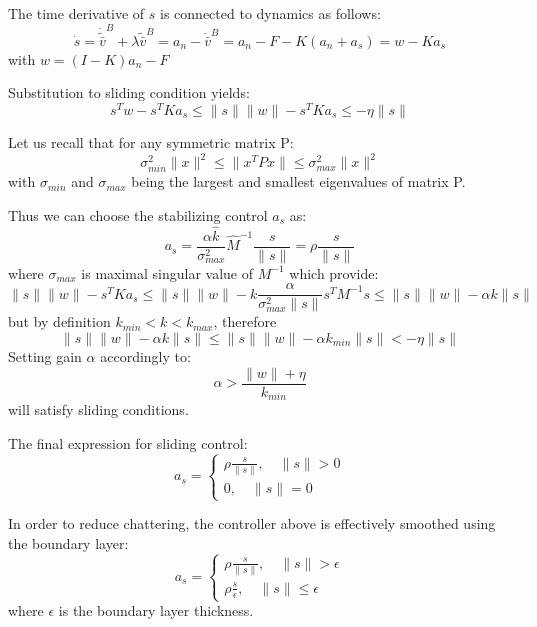     The time derivative of $s$ is connected to dynamics as follows:
    $$
    \dot{s} = \dot{\tilde{\bar{v}}}^B + \lambda \tilde{\bar{v}}^B = 
    a_n - \dot{\bar{v}}^B = a_n - F - K(a_n + a_s) = w - Ka_s 
    $$
    with $w = (I - K)a_n - F $

    Substitution to sliding condition yields:
    $$
    s^Tw- s^TKa_s  \leq \|s\|\|w\| - s^TKa_s  \leq - \eta \|s\|
    $$

    Let us recall that for any symmetric matrix P:
    $$
    \sigma^2_{min} \|x\|^2 \leq \|x^TPx\| \leq \sigma^2_{max} \|x\|^2
    $$
    with $\sigma_{min}$ and $\sigma_{max}$ being the largest and smallest 
    eigenvalues of matrix P.

    Thus we can choose the stabilizing control $a_s$ as:
    $$
        a_s = \frac{\alpha \hat{k}}{\sigma_{max}^2}\hat{M}^{-1}\frac{s}{\|s\|} = 
        \rho \frac{s}{\|s\|} 
    $$ 
    where $\sigma_{max}$ is maximal singular value of $M^{-1}$
    which provide:
    $$
        \|s\|\|w\| - s^TKa_s \leq 
        \|s\|\|w\| - k \frac{\alpha}{\sigma^2_{max}\|s\|}s^TM^{-1}s \leq 
        \|s\|\|w\| - \alpha k \|s\|
    $$
    but by definition $k_{min} < k < k_{max}$, therefore
    $$
        \|s\|\|w\| - \alpha k \|s\| \leq
        \|s\|\|w\| - \alpha k_{min} \|s\| < - \eta \|s\|
    $$
    Setting gain $\alpha$ accordingly to:
    $$
    \alpha > \frac{\|w\| + \eta}{k_{min}}
    $$
    will satisfy sliding conditions.

    The final expression for sliding control:
    $$    
    a_s = 
    \begin{cases}
    \rho \frac{s}{\|s\|}, \quad \|s\| > 0\\
    0, \quad \|s\| = 0 
    \end{cases}
    $$

    In order to reduce chattering, the controller above is effectively smoothed using
    the boundary layer:
    $$
    a_s = 
    \begin{cases}
    \rho \frac{s}{\|s\|}, \quad \|s\| >\epsilon\\
    \rho \frac{s}{\epsilon}, \quad \|s\| \leq\epsilon
    \end{cases}
    $$
    where $\epsilon$ is the boundary layer thickness.

